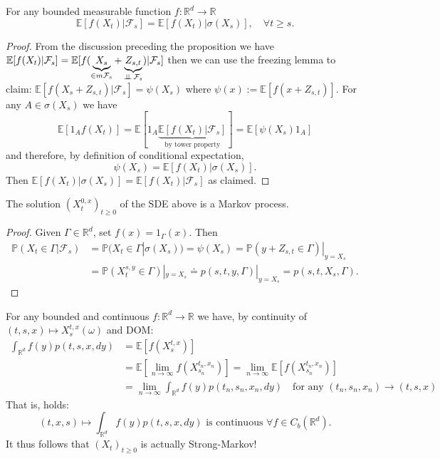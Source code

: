 \begin{proposition}
    For any bounded measurable function $f: \mathbb{R}^d \to \mathbb{R}$
    $$\mathbb{E}[f(X_t) | \mathcal{F}_s] = \mathbb{E}[f(X_t) | \sigma(X_s)], \quad \forall t \ge s.$$
\end{proposition}

\begin{proof}
    From the discussion preceding the proposition we have $\mathbb{E}[f(X_t) | \mathcal{F}_s] = \mathbb{E}[f(\underbrace{X_s}_{\in m\mathcal{F}_s} + \underbrace{Z_{s,t}}_{\operatorname{\perp\!\!\!\perp} \mathcal{F}_s}) | \mathcal{F}_s]$ then we can use the freezing lemma to claim:
    $\mathbb{E}[f(X_s + Z_{s,t}) | \mathcal{F}_s] = \psi(X_s)$ where $\psi(x) := \mathbb{E}[f(x + Z_{s,t})]$.
    For any $A \in \sigma(X_s)$ we have
    $$\mathbb{E}[1_A f(X_t)] = \mathbb{E}[1_A \underbrace{\mathbb{E}[f(X_t) | \mathcal{F}_s]}_{\text{by tower property}}] = \mathbb{E}[\psi(X_s) 1_A]$$
    and therefore, by definition of conditional expectation,
    $$\psi(X_s) = \mathbb{E}[f(X_t) | \sigma(X_s)].$$
    Then $\mathbb{E}[f(X_t) | \sigma(X_s)] = \mathbb{E}[f(X_t) | \mathcal{F}_s]$ as claimed.
\end{proof}

\begin{corollary}
    The solution $(X_t^{0,x})_{t \ge 0}$ of the SDE above is a Markov process.
\end{corollary}

\begin{proof}
    Given $\Gamma \in \mathbb{R}^d$, set $f(x) = 1_\Gamma(x)$. Then
    \begin{align*}
        \mathbb{P}(X_t \in \Gamma | \mathcal{F}_s) &= \mathbb{P}(X_t \in \Gamma | \sigma(X_s)) = \psi(X_s) = \mathbb{P}(y + Z_{s,t} \in \Gamma)|_{y=X_s} \\
        &= \mathbb{P}(X_t^{s,y} \in \Gamma)|_{y=X_s} \doteq p(s,t,y,\Gamma)|_{y=X_s} = p(s,t,X_s,\Gamma).
    \end{align*}
\end{proof}

\begin{remark}
    For any bounded and continuous $f: \mathbb{R}^d \to \mathbb{R}$ we have, by continuity of $(t,s,x) \mapsto X_s^{t,x}(\omega)$ and DOM:
    \begin{align*}
        \int_{\mathbb{R}^d} f(y)p(t,s,x,dy) &= \mathbb{E}[f(X_s^{t,x})] \\
        &= \mathbb{E}[\lim_{n \to \infty} f(X_{s_n}^{t_n, x_n})] = \lim_{n \to \infty} \mathbb{E}[f(X_{s_n}^{t_n, x_n})] \\
        &= \lim_{n \to \infty} \int_{\mathbb{R}^d} f(y)p(t_n, s_n, x_n, dy) \quad \text{for any } (t_n, s_n, x_n) \to (t,s,x)
    \end{align*}
    That is,  holds:
    $$(t,x,s) \mapsto \int_{\mathbb{R}^d} f(y)p(t,s,x,dy) \text{ is continuous } \forall f \in C_b(\mathbb{R}^d).$$
    It thus follows that $(X_t)_{t \ge 0}$ is actually Strong-Markov!
\end{remark}


